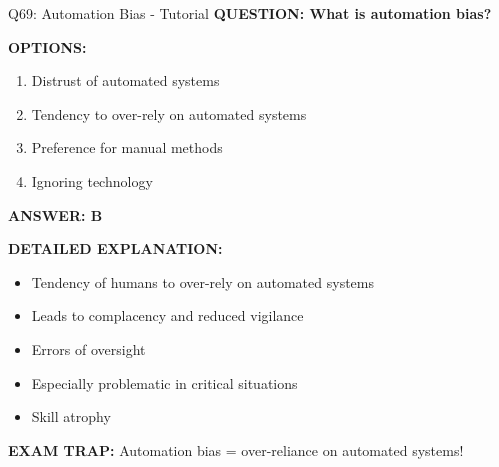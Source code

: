 \documentclass[8pt]{beamer}
\begin{document}
	\begin{frame}{Q69: Automation Bias - Tutorial}
		\fontsize{6.5}{7.5}\selectfont
		\textbf{QUESTION: What is automation bias?}
		
		\vspace{0.1cm}
		\textbf{OPTIONS:}
		\begin{enumerate}
			\item Distrust of automated systems
			\item Tendency to over-rely on automated systems
			\item Preference for manual methods
			\item Ignoring technology
		\end{enumerate}
		
		\vspace{0.1cm}
		\textcolor{myblue}{\textbf{ANSWER: B}}
		
		\vspace{0.1cm}
		\textbf{DETAILED EXPLANATION:}
		\begin{itemize}
			\item Tendency of humans to over-rely on automated systems
			\item Leads to complacency and reduced vigilance
			\item Errors of oversight
			\item Especially problematic in critical situations
			\item Skill atrophy
		\end{itemize}
		
		\vspace{0.1cm}
		\textcolor{myred}{\textbf{EXAM TRAP:}} Automation bias = \textcolor{myblue}{over-reliance on automated systems}!
	\end{frame}
	
\end{document}

